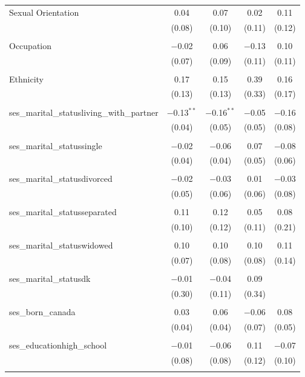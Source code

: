 \begin{table}[!htbp]
\begin{tabular}{@{\extracolsep{5pt}}lcccc}
 Sexual Orientation & 0.04 & 0.07 & 0.02 & 0.11 \\ 
  & (0.08) & (0.10) & (0.11) & (0.12) \\ 
  & & & & \\ 
 Occupation & $-$0.02 & 0.06 & $-$0.13 & 0.10 \\ 
  & (0.07) & (0.09) & (0.11) & (0.11) \\ 
  & & & & \\ 
 Ethnicity & 0.17 & 0.15 & 0.39 & 0.16 \\ 
  & (0.13) & (0.13) & (0.33) & (0.17) \\ 
  & & & & \\ 
 ses\_marital\_statusliving\_with\_partner & $-$0.13$^{**}$ & $-$0.16$^{**}$ & $-$0.05 & $-$0.16 \\ 
  & (0.04) & (0.05) & (0.05) & (0.08) \\ 
  & & & & \\ 
 ses\_marital\_statussingle & $-$0.02 & $-$0.06 & 0.07 & $-$0.08 \\ 
  & (0.04) & (0.04) & (0.05) & (0.06) \\ 
  & & & & \\ 
 ses\_marital\_statusdivorced & $-$0.02 & $-$0.03 & 0.01 & $-$0.03 \\ 
  & (0.05) & (0.06) & (0.06) & (0.08) \\ 
  & & & & \\ 
 ses\_marital\_statusseparated & 0.11 & 0.12 & 0.05 & 0.08 \\ 
  & (0.10) & (0.12) & (0.11) & (0.21) \\ 
  & & & & \\ 
 ses\_marital\_statuswidowed & 0.10 & 0.10 & 0.10 & 0.11 \\ 
  & (0.07) & (0.08) & (0.08) & (0.14) \\ 
  & & & & \\ 
 ses\_marital\_statusdk & $-$0.01 & $-$0.04 & 0.09 &  \\ 
  & (0.30) & (0.11) & (0.34) &  \\ 
  & & & & \\ 
 ses\_born\_canada & 0.03 & 0.06 & $-$0.06 & 0.08 \\ 
  & (0.04) & (0.04) & (0.07) & (0.05) \\ 
  & & & & \\ 
 ses\_educationhigh\_school & $-$0.01 & $-$0.06 & 0.11 & $-$0.07 \\ 
  & (0.08) & (0.08) & (0.12) & (0.10) \\ 
  & & & & \\ 

\end{tabular}
\end{table}
